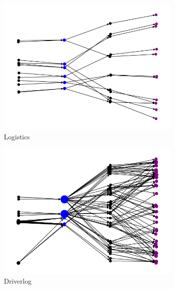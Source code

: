 \documentclass{article}
\theoremstyle{remark}
\begin{document}
\begin{figure}[t!]
\begin{subfigure}[b]{0.3\textwidth}
  \includegraphics[width=1\linewidth]{Dependencies_graphs/DepGraphLogistics}
  \caption{Logistics}
  \label{fig:DepGraphLogistics}
\end{subfigure}\hspace{1em}
\begin{subfigure}[b]{0.3\textwidth}
\centering
  \includegraphics[width=1\linewidth]{Dependencies_graphs/DepGraphDriverlog}
  \caption{Driverlog}
  \label{fig:DepGraphDriverlog}
\end{subfigure}\hspace{1em}
\begin{subfigure}[b]{0.3\textwidth}
\centering

\end{subfigure}
\end{figure}
\end{document}
